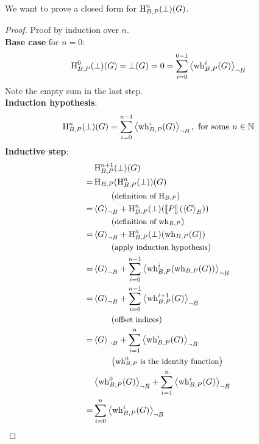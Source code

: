 We want to prove a closed form for $\hh^n(\bot)(G)$.
\begin{lemma}[continues=lem:ext:closedformhh]
	\begin{proof}
		Proof by induction over $n$. \\
		\textbf{Base case} for $n = 0$: \\
		\[ \hh^0(\bot)(G) = \bot(G) = 0 = \sum_{i = 0}^{0 - 1} \resN{\wh^i(G)} \]
		Note the empty sum in the last step. \\
		\textbf{Induction hypothesis}:
		\[ \hh^n(\bot)(G) = \sum_{i = 0}^{n-1} \resN{\wh^i(G)}, \text{ for some } n \in \N \]
		\textbf{Inductive step}:
		\begin{align*}
			 & \hh^{n+1}(\bot)(G) \\
			=& \hh( \hh^n(\bot) )(G) \\
			 & \explain{definition of $\hh$} \\
			=& \resN{G} + \hh^n(\bot) ( \smtx{P}(\resP{G}) ) \\
			 & \explain{definition of $\wh$} \\
			=& \resN{G} + \hh^n(\bot) ( \wh(G) ) \\
			 & \explain{apply induction hypothesis} \\
			=& \resN{G} + \sum_{i=0}^{n-1} \resN{ \wh^i( \wh(G) )} \\
			=& \resN{G} + \sum_{i=0}^{n-1} \resN{ \wh^{i+1}(G)} \\			
			 & \explain{offset indices} \\
			=& \resN{G} + \sum_{i=1}^{n} \resN{ \wh^i(G)} \\
			 & \explain{$\wh^0$ is the identity function} \\
			 & \resN{ \wh^0(G) } + \sum_{i=1}^{n} \resN{ \wh^i(G)} \\
			=& \sum_{i=0}^{n} \resN{ \wh^i(G)}		\qedhere
		\end{align*}
	\end{proof}
\end{lemma}